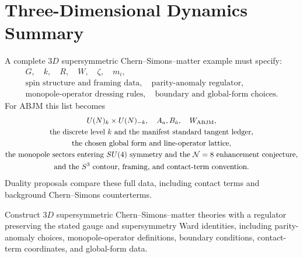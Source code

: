 \section{Three-Dimensional Dynamics Summary}

A complete \(3D\) supersymmetric Chern--Simons--matter example must specify:
\[
\begin{gathered}
  G,\quad k,\quad R,\quad W,\quad \zeta,\quad m_i,\\
  \text{spin structure and framing data},\quad
  \text{parity-anomaly regulator},\\
  \text{monopole-operator dressing rules},\quad
  \text{boundary and global-form choices}.
\end{gathered}
\]
For ABJM this list becomes
\[
\begin{gathered}
  U(N)_k\times U(N)_{-k},\quad
  A_a,B_{\dot a},\quad W_{\rm ABJM},\\
  \text{the discrete level } k \text{ and the manifest standard tangent
  ledger},\\
  \text{the chosen global form and line-operator lattice},\\
  \text{the monopole sectors entering }SU(4)\text{ symmetry and the }
  \mathcal N=8 \text{ enhancement conjecture},\\
  \text{and the }S^3\text{ contour, framing, and contact-term convention}.
\end{gathered}
\]
Duality proposals compare these full data, including contact terms and
background Chern--Simons counterterms.

\begin{openproblem}
\label{op:three-dimensional-susy-cs-matter-continuum}
Construct \(3D\) supersymmetric Chern--Simons--matter theories with a
regulator preserving the stated gauge and supersymmetry Ward identities,
including parity-anomaly choices, monopole-operator definitions, boundary
conditions, contact-term coordinates, and global-form data.
\end{openproblem}
